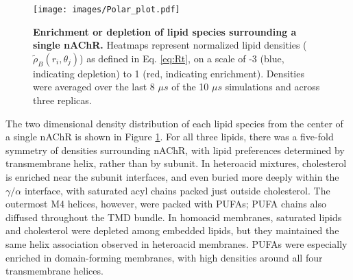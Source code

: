 \begin{figure}[htp]
\centering
\texttt{[image: images/Polar\_plot.pdf]}
\caption[Polar plot.]{{\bf Enrichment or depletion of lipid species surrounding a single nAChR.} Heatmaps represent normalized lipid densities ($\tilde{\rho}_{B}(r_i,\theta_j)$) as defined in Eq. \ref{eq:Rt}, on a scale of -3 (blue, indicating depletion) to 1 (red, indicating enrichment). Densities were averaged over the last 8 $\mu s$ of the 10 $\mu s$ simulations and across three replicas.} \label{fig:Fig2c}
\end{figure}


The two dimensional density distribution of each lipid species from the center of a single nAChR is shown in Figure \ref{fig:Fig2c}. For all three lipids, there was a five-fold symmetry of densities surrounding nAChR, with lipid preferences determined by transmembrane helix, rather than by subunit. In heteroacid mixtures, cholesterol is enriched near the subunit interfaces, and even buried more deeply within the $\gamma/\alpha$ interface, with saturated acyl chains packed just outside cholesterol.  The outermost M4 helices, however, were packed with PUFAs; PUFA chains also diffused throughout the TMD bundle.  In homoacid membranes, saturated lipids and cholesterol were depleted among embedded lipids, but they maintained the same helix association observed in heteroacid membranes. PUFAs were especially enriched in domain-forming membranes, with high densities around all four transmembrane helices. 



